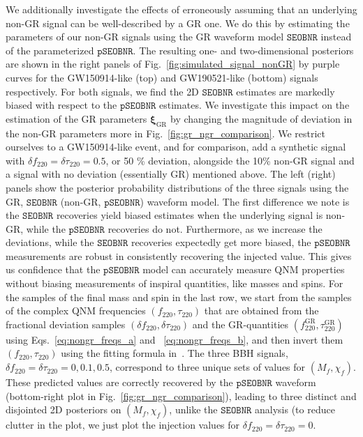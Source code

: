 \documentclass[twocolumn,prd,aps,superscriptaddress,preprintnumbers,tightenlines,showpacs,nofootinbib,eqsecnum,amsfonts,amsmath]{revtex4-1}
\newcommand{\abhi}[1]{\textcolor{Emerald}{#1}}
\newcommand{\bxigr}{\bm{\xi}_{\text{GR}}}
\newcommand{\df}[1]{\delta f_{\text{#1}}}
\newcommand{\dtau}[1]{\delta \tau_{\text{#1}}}
\newcommand{\fngr}[1]{f_{\text{#1}}}
\newcommand{\taungr}[1]{\tau_{\text{#1}}}
\newcommand{\fgr}[1]{f ^{\text{GR}}_{\text{#1}}}
\newcommand{\taugr}[1]{\tau ^{\text{GR}}_{\text{#1}}}
\newcommand{\pSEOB}{\texttt{pSEOBNR}}
\newcommand{\SEOB}{\texttt{SEOBNR}}
\begin{document}
We additionally investigate the effects of erroneously assuming that
an underlying non-GR signal can be well-described by a GR one. We do
this by estimating the parameters of our non-GR signals using the GR
waveform model $\SEOB$ instead of the parameterized $\pSEOB$.  The
resulting one- and two-dimensional posteriors are shown in the right
panels of Fig.~\ref{fig:simulated_signal_nonGR} by purple curves for the
GW150914-like (top) and GW190521-like (bottom) signals
respectively. For both signals, we find the \abhi{2D} $\SEOB$ estimates are
markedly biased with respect to the $\pSEOB$ estimates.  We investigate 
this impact on the estimation of the GR parameters $\bxigr$ by changing the
magnitude of deviation in the non-GR parameters more in Fig.~\ref{fig:gr_ngr_comparison}. We restrict ourselves 
to a GW150914-like event, and for comparison, add a synthetic signal
with $\df{220} = \dtau{220} = 0.5$, or 50 \% deviation, alongside the
10\% non-GR signal and a signal with no deviation (essentially GR)
mentioned above. The left (right) panels show the
posterior probability distributions of the three signals using the GR,
$\SEOB$ (non-GR, $\pSEOB$) waveform model. The first difference we
note is the $\SEOB$ recoveries yield biased estimates when the
underlying signal is non-GR, while the $\pSEOB$ recoveries do
not. Furthermore, as we increase the deviations, while the $\SEOB$
recoveries expectedly get more biased, the $\pSEOB$ measurements are
robust in consistently recovering the injected value. This gives us 
confidence that the $\pSEOB$ model can accurately measure QNM 
properties without biasing measurements of inspiral quantities, like masses and spins.
\abhi{For the samples of the final mass and spin in the last row, we start from the samples
of the complex QNM frequencies $(\fngr{220}, \taungr{220})$ that are obtained from the 
fractional deviation samples $(\df{220},\dtau{220})$ and the GR-quantities
$(\fgr{220},\taugr{220})$ using Eqs.~\ref{eq:nongr_freqs_a} and ~\ref{eq:nongr_freqs_b},
and then invert them $(\fngr{220}, \taungr{220})$ using the fitting formula in~\cite{Berti:2005ys}.
The three BBH signals, $\df{220} = \dtau{220} = 0, 0.1, 0.5$, correspond to
three unique sets of values for $(M_f,\chi_f)$. These predicted values are correctly 
recovered by the $\pSEOB$ waveform (bottom-right plot in Fig.~\ref{fig:gr_ngr_comparison}),
leading to three distinct and disjointed 2D posteriors on $(M_f,\chi_f)$, unlike the $\SEOB$
analysis (to reduce clutter in the plot, we just plot the injection values for $\df{220} = \dtau{220} = 0$. }
\end{document}
